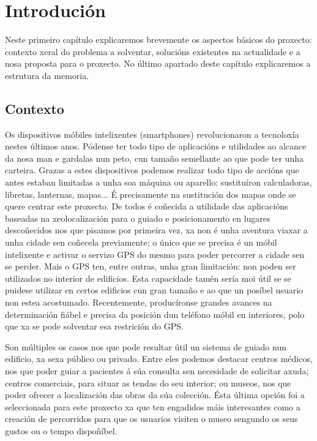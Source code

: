 \chapter{Introdución}

Neste primeiro capítulo explicaremos brevemente os aspectos básicos do proxecto: contexto xeral do problema a solventar, solucións existentes na actualidade e a nosa proposta para o proxecto. No último apartado deste capítulo explicaremos a estrutura da memoria.

\section{Contexto}

Os dispositivos móbiles intelixentes (smartphones) revolucionaron a tecnoloxía nestes últimos anos. Pódense ter todo tipo de aplicacións e utilidades ao alcance da nosa man e gardalas nun peto, cun tamaño semellante ao que pode ter unha carteira. Grazas a estes dispositivos podemos realizar todo tipo de accións que antes estaban limitadas a unha soa máquina ou aparello: sustituíron calculadoras, libretas, lanternas, mapas... É precisamente na sustitución dos mapas onde se quere centrar este proxecto. De todos é coñecida a utilidade das aplicacións baseadas na xeolocalización para o guiado e posicionamento en lugares descoñecidos nos que pisamos por primeira vez, xa non é unha aventura viaxar a unha cidade sen coñecela previamente; o único que se precisa é un móbil intelixente e activar o servizo GPS do mesmo para poder percorrer a cidade sen se perder. Mais o GPS ten, entre outras, unha gran limitación: non poden ser utilizados no interior de edificios. Esta capacidade tamén sería moi útil se se puidese utilizar en certos edificios cun gran tamaño e ao que un posíbel usuario non estea acostumado. Recentemente, producíronse grandes avances na determinación fiábel e precisa da posición dun teléfono móbil en interiores, polo que xa se pode solventar esa restrición do GPS.

Son múltiples os casos nos que pode resultar útil un sistema de guiado nun edificio, xa sexa público ou privado. Entre eles podemos destacar centros médicos, nos que poder guiar a pacientes á súa consulta sen necesidade de solicitar axuda; centros comerciais, para situar as tendas do seu interior; ou museos, nos que poder ofrecer a localización das obras da súa colección. Ésta última opción foi a seleccionada para este proxecto xa que ten engadidos máis interesantes como a creación de percorridos para que os usuarios visiten o museo sengundo os seus gustos ou o tempo dispoñíbel.

